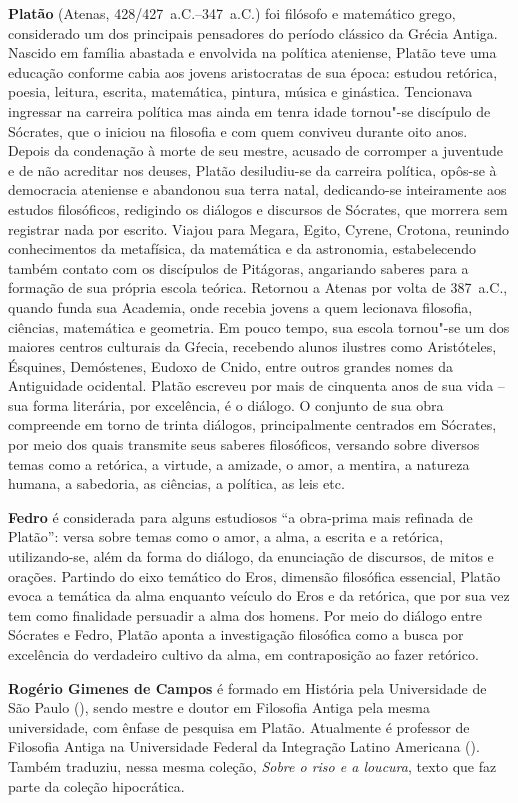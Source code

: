 
\textbf{Platão} (Atenas, 428/427~a.C.--347~a.C.) foi filósofo e matemático grego, considerado um dos principais pensadores do período clássico da Grécia Antiga. Nascido em família abastada e envolvida na política ateniense, Platão teve uma educação conforme cabia aos jovens aristocratas de sua época: estudou retórica, poesia, leitura, escrita, matemática, pintura, música e ginástica. Tencionava ingressar na carreira política mas ainda em tenra idade tornou"-se discípulo de Sócrates, que o iniciou na filosofia e com quem conviveu durante oito anos. Depois da condenação à morte de seu mestre, acusado de corromper a juventude e de não acreditar nos deuses, Platão desiludiu-se da carreira política, opôs-se à democracia ateniense e abandonou sua terra natal, dedicando-se inteiramente aos estudos filosóficos, redigindo os diálogos e discursos de Sócrates, que morrera sem registrar nada por escrito. Viajou para Megara, Egito, Cyrene, Crotona, reunindo conhecimentos da metafísica, da matemática e da astronomia, estabelecendo também contato com os discípulos de Pitágoras, angariando saberes para a formação de sua própria escola teórica. Retornou a Atenas por volta de 387~a.C., quando funda sua Academia, onde recebia jovens a quem lecionava filosofia, ciências, matemática e geometria. Em pouco tempo, sua escola tornou"-se um dos maiores centros culturais da Gŕecia, recebendo alunos ilustres como Aristóteles, Ésquines, Demóstenes, Eudoxo de Cnido, entre outros grandes nomes da Antiguidade ocidental. Platão escreveu por mais de cinquenta anos de sua vida -- sua forma literária, por excelência, é o diálogo. O conjunto de sua obra compreende em torno de trinta diálogos, principalmente centrados em Sócrates, por meio dos quais transmite seus saberes filosóficos, versando sobre diversos temas como a retórica, a virtude, a amizade, o amor, a mentira, a natureza humana, a sabedoria, as ciências, a política, as leis etc. 

\textbf{Fedro} é considerada para alguns estudiosos ``a obra-prima mais refinada de Platão'': versa sobre temas como o amor, a alma, a escrita e a retórica, utilizando-se, além da forma do diálogo, da enunciação de discursos, de mitos e orações. Partindo do eixo temático do Eros, dimensão filosófica essencial, Platão evoca a temática da alma enquanto veículo do Eros e da retórica, que por sua vez tem como finalidade persuadir a alma dos homens. Por meio do diálogo entre Sócrates e Fedro, Platão aponta a investigação filosófica como a busca por excelência do verdadeiro cultivo da alma, em contraposição ao fazer retórico. 


\textbf{Rogério Gimenes de Campos} é formado em História pela Universidade de São Paulo (), sendo mestre e doutor em Filosofia Antiga pela mesma universidade, com ênfase de pesquisa em Platão. Atualmente é professor de Filosofia Antiga na Universidade Federal da Integração Latino Americana (). Também traduziu, nessa mesma coleção, \emph{Sobre o riso e a loucura}, texto que faz parte da coleção hipocrática. 


